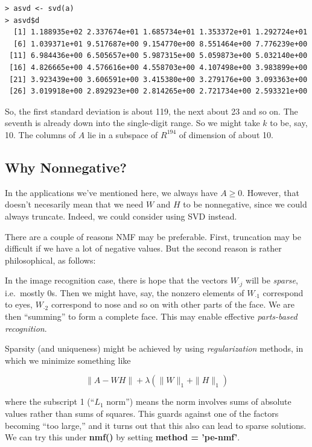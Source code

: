 \begin{lstlisting}
> asvd <- svd(a)
> asvd$d
  [1] 1.188935e+02 2.337674e+01 1.685734e+01 1.353372e+01 1.292724e+01
  [6] 1.039371e+01 9.517687e+00 9.154770e+00 8.551464e+00 7.776239e+00
 [11] 6.984436e+00 6.505657e+00 5.987315e+00 5.059873e+00 5.032140e+00
 [16] 4.826665e+00 4.576616e+00 4.558703e+00 4.107498e+00 3.983899e+00
 [21] 3.923439e+00 3.606591e+00 3.415380e+00 3.279176e+00 3.093363e+00
 [26] 3.019918e+00 2.892923e+00 2.814265e+00 2.721734e+00 2.593321e+00
\end{lstlisting}

So, the first standard deviation is about 119, the next about 23 and so
on.  The seventh is already down into the single-digit range.  So we
might take $k$ to be, say, 10.  The columns of $A$ lie in a subspace of
$R^{194}$ of dimension of about 10.

\subsection{Why Nonnegative?}

In the applications we've mentioned here, we always have $A \geq 0$.
However, that doesn't necesarily mean that we need $W$ and $H$ to be
nonnegative, since we could always truncate.  Indeed, we could consider
using SVD instead.

There are a couple of reasons NMF may be preferable.  First, truncation
may be difficult if we have a lot of negative values.  But the second
reason is rather philosophical, as follows:

In the image recognition case, there is hope that the vectors $W_{\cdot
j}$ will be {\it sparse}, i.e.\ mostly 0s. Then we might have, say, the
nonzero elements of $W_{\cdot 1}$ correspond to eyes, $W_{\cdot 2}$
correspond to nose and so on with other parts of the face.  We are then
``summing'' to form a complete face.  This may enable effective {\it
parts-based recognition}.

Sparsity (and uniqueness) might be achieved by using {\it
regularization} methods, in which we minimize something like

\begin{equation}
\|A - WH\| + \lambda (\|W\|_1 + \|H\|_1)
\end{equation}

where the subscript 1 (``$L_1$ norm'') means the norm involves sums of
absolute values rather than sums of squares.  This guards against one of
the factors becoming ``too large,'' and it turns out that this also can
lead to sparse solutions.  We can try this under {\bf nmf()}  by setting
{\bf method = 'pe-nmf'}.


